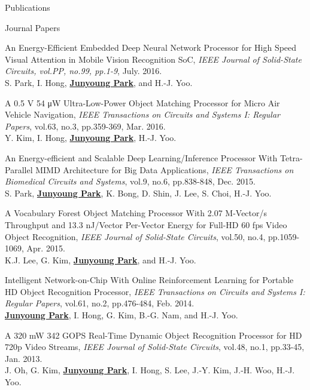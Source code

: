 \documentclass{resume} %
\begin{document}
\begin{section}{Publications}

\begin{subsection}{Journal Papers}{}{}{}

\item An Energy-Efficient Embedded Deep Neural Network Processor for High Speed Visual Attention in Mobile Vision Recognition SoC,
\emph{IEEE Journal of Solid-State Circuits, vol.PP, no.99, pp.1-9}, July. 2016. \\
{\small S. Park, I. Hong, \underline{\bf Junyoung Park}, and H.-J. Yoo.}

\item A 0.5 V 54 μW Ultra-Low-Power Object Matching Processor for Micro Air Vehicle Navigation,
\emph{IEEE Transactions on Circuits and Systems I: Regular Papers}, vol.63, no.3, pp.359-369, Mar. 2016. \\
{\small Y. Kim, I. Hong, \underline{\bf Junyoung Park}, H.-J. Yoo.}

\item An Energy-efficient and Scalable Deep Learning/Inference Processor With Tetra-Parallel MIMD Architecture for Big Data Applications,
\emph{IEEE Transactions on Biomedical Circuits and Systems}, vol.9, no.6, pp.838-848, Dec. 2015. \\
{\small S. Park, \underline{\bf Junyoung Park}, K. Bong, D. Shin, J. Lee, S. Choi, H.-J. Yoo.}

\item A Vocabulary Forest Object Matching Processor With 2.07 M-Vector/s Throughput and 13.3 nJ/Vector Per-Vector Energy for Full-HD 60 fps Video Object Recognition, \emph{IEEE Journal of Solid-State Circuits}, vol.50, no.4, pp.1059-1069, Apr. 2015. \\
{\small K.J. Lee, G. Kim, \underline{\bf Junyoung Park}, and H.-J. Yoo.}

\item Intelligent Network-on-Chip With Online Reinforcement Learning for Portable HD Object Recognition Processor, \emph{IEEE Transactions on Circuits and Systems I: Regular Papers}, vol.61, no.2, pp.476-484, Feb. 2014. \\
{\small \underline{\bf Junyoung Park}, I. Hong, G. Kim, B.-G. Nam, and H.-J. Yoo.}

\item A 320 mW 342 GOPS Real-Time Dynamic Object Recognition Processor for HD 720p Video Streams, \emph{IEEE Journal of Solid-State Circuits}, vol.48, no.1, pp.33-45, Jan. 2013. \\
{\small J. Oh, G. Kim, \underline{\bf Junyoung Park}, I. Hong, S. Lee, J.-Y. Kim, J.-H. Woo, H.-J. Yoo.}


\end{subsection}
\end{section}
\end{document}
